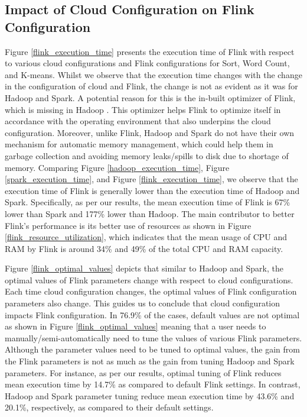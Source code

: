 \documentclass[3p]{elsarticle}
\begin{document}
\subsection{Impact of Cloud Configuration on Flink Configuration}

Figure \ref{flink_execution_time} presents the execution time of Flink with respect to various cloud configurations and Flink configurations for Sort, Word Count, and K-means. Whilst we observe that the execution time changes with the change in the configuration of cloud and Flink, the change is not as evident as it was for Hadoop and Spark. A potential reason for this is the in-built optimizer of Flink, which is missing in Hadoop \cite{carbone2015apache}. This optimizer helps Flink to optimize itself in accordance with the operating environment that also underpins the cloud configuration. Moreover, unlike Flink, Hadoop and Spark do not have their own mechanism for automatic memory management, which could help them in garbage collection and avoiding memory leaks/spills to disk due to shortage of memory. Comparing Figure \ref{hadoop_execution_time}, Figure \ref{spark_execution_time}, and Figure \ref{flink_execution_time}, we observe that the execution time of Flink is generally lower than the execution time of Hadoop and Spark. Specifically, as per our results, the mean execution time of Flink is 67\% lower than Spark and 177\% lower than Hadoop. The main contributor to better Flink's performance is its better use of resources as shown in Figure \ref{flink_resource_utilization}, which indicates that the mean usage of CPU and RAM by Flink is around 34\% and 49\% of the total CPU and RAM capacity. 

Figure \ref{flink_optimal_values} depicts that similar to Hadoop and Spark, the optimal values of Flink parameters change with respect to cloud configurations. Each time cloud configuration changes, the optimal values of Flink configuration parameters also change. This guides us to conclude that cloud configuration impacts Flink configuration. In 76.9\% of the cases, default values are not optimal as shown in Figure \ref{flink_optimal_values} meaning that a user needs to manually/semi-automatically need to tune the values of various Flink parameters. Although the parameter values need to be tuned to optimal values, the gain from the Flink parameters is not as much as the gain from tuning Hadoop and Spark parameters. For instance, as per our results, optimal tuning of Flink reduces mean execution time by 14.7\% as compared to default Flink settings. In contrast, Hadoop and Spark parameter tuning reduce mean execution time by 43.6\% and 20.1\%, respectively, as compared to their default settings. 
\end{document}
